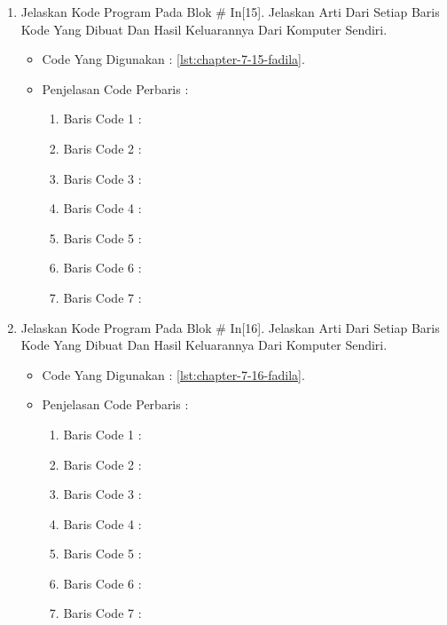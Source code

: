 \begin{enumerate}
\par
\item Jelaskan Kode Program Pada Blok \# In[15]. Jelaskan Arti Dari Setiap Baris Kode Yang Dibuat Dan Hasil Keluarannya Dari Komputer Sendiri.
\begin{itemize}
\item Code Yang Digunakan : \ref{lst:chapter-7-15-fadila}.

\par
\par
\item Penjelasan Code Perbaris	: 
\begin{enumerate}
\item Baris Code 1	:
\item Baris Code 2	:
\item Baris Code 3	:
\item Baris Code 4	:
\item Baris Code 5	:
\item Baris Code 6	:
\item Baris Code 7	:
\end{enumerate}
\par
\end{itemize}
\par
\par
\par
\item Jelaskan Kode Program Pada Blok \# In[16]. Jelaskan Arti Dari Setiap Baris Kode Yang Dibuat Dan Hasil Keluarannya Dari Komputer Sendiri.
\begin{itemize}
\item Code Yang Digunakan : \ref{lst:chapter-7-16-fadila}.

\par
\par
\item Penjelasan Code Perbaris	: 
\begin{enumerate}
\item Baris Code 1	:
\item Baris Code 2	:
\item Baris Code 3	:
\item Baris Code 4	:
\item Baris Code 5	:
\item Baris Code 6	:
\item Baris Code 7	:

\end{enumerate}
\end{itemize}
\end{enumerate}
